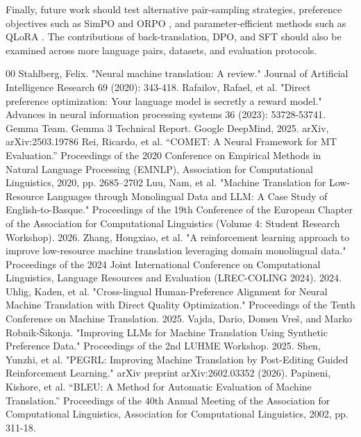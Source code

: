 \documentclass[conference]{IEEEtran}
\begin{document}
Finally, future work should test alternative pair-sampling strategies, preference objectives such as SimPO \cite{b19} and ORPO \cite{b20}, and parameter-efficient methods such as QLoRA \cite{b21}. The contributions of back-translation, DPO, and SFT should also be examined across more language pairs, datasets, and evaluation protocols.

\begin{thebibliography}{00}
              Stahlberg, Felix. "Neural machine translation: A review." Journal of Artificial Intelligence Research 69 (2020): 343-418.
              Rafailov, Rafael, et al. "Direct preference optimization: Your language model is secretly a reward model." Advances in neural information processing systems 36 (2023): 53728-53741.
              Gemma Team. Gemma 3 Technical Report. Google DeepMind, 2025. arXiv, arXiv:2503.19786
              Rei, Ricardo, et al. “COMET: A Neural Framework for MT Evaluation.” Proceedings of the 2020 Conference on Empirical Methods in Natural Language Processing (EMNLP), Association for Computational Linguistics, 2020, pp. 2685–2702
              Luu, Nam, et al. "Machine Translation for Low-Resource Languages through Monolingual Data and LLM: A Case Study of English-to-Basque." Proceedings of the 19th Conference of the European Chapter of the Association for Computational Linguistics (Volume 4: Student Research Workshop). 2026.
              Zhang, Hongxiao, et al. "A reinforcement learning approach to improve low-resource machine translation leveraging domain monolingual data." Proceedings of the 2024 Joint International Conference on Computational Linguistics, Language Resources and Evaluation (LREC-COLING 2024). 2024.
              Uhlig, Kaden, et al. "Cross-lingual Human-Preference Alignment for Neural Machine Translation with Direct Quality Optimization." Proceedings of the Tenth Conference on Machine Translation. 2025.
              Vajda, Dario, Domen Vreš, and Marko Robnik-Šikonja. "Improving LLMs for Machine Translation Using Synthetic Preference Data." Proceedings of the 2nd LUHME Workshop. 2025.
              Shen, Yunzhi, et al. "PEGRL: Improving Machine Translation by Post-Editing Guided Reinforcement Learning." arXiv preprint arXiv:2602.03352 (2026).
              Papineni, Kishore, et al. “BLEU: A Method for Automatic Evaluation of Machine Translation.” Proceedings of the 40th Annual Meeting of the Association for Computational Linguistics, Association for Computational Linguistics, 2002, pp. 311-18.

\end{thebibliography}
\end{document}
